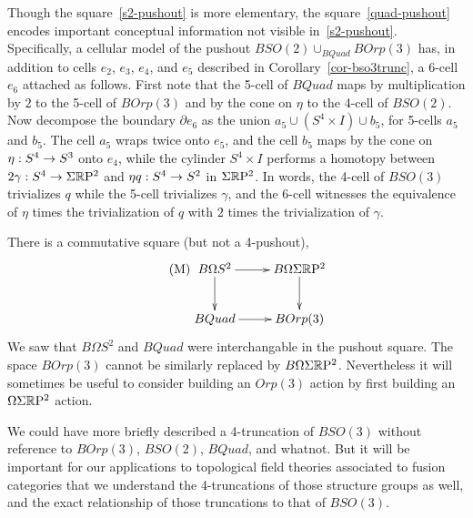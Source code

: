\documentclass{amsart}
\begin{document}
\nid Though the square~\eqref{s2-pushout} is more elementary, the square~\eqref{quad-pushout} encodes important conceptual information not visible in~\eqref{s2-pushout}.  Specifically, a cellular model of the pushout $BSO(2) \cup_{BQuad} BOrp(3)$ has, in addition to cells $e_2$, $e_3$, $e_4$, and $e_5$ described in Corollary~\ref{cor-bso3trunc}, a 6-cell $e_6$ attached as follows.  First note that the 5-cell of $BQuad$ maps by multiplication by $2$ to the 5-cell of $BOrp(3)$ and by the cone on $\eta$ to the 4-cell of $BSO(2)$.  %
Now decompose the boundary $\partial e_6$ as the union $a_5 \cup (S^4 \times I) \cup b_5$, for 5-cells $a_5$ and $b_5$.  The cell $a_5$ wraps twice onto $e_5$, and the cell $b_5$ maps by the cone on $\eta: S^4 \rightarrow S^3$ onto $e_4$, while the cylinder $S^4 \times I$ performs a homotopy between $2 \gamma : S^4 \rightarrow \Sigma \mathbb R \mathrm{P}^2$ and $\eta q: S^4 \rightarrow S^2$ in $\Sigma \mathbb R \mathrm{P}^2$.  In words, the 4-cell of $BSO(3)$ trivializes $q$ while the 5-cell trivializes $\gamma$, and the 6-cell witnesses the equivalence of $\eta$ times the trivialization of $q$ with $2$ times the trivialization of $\gamma$.

\begin{remark}
There is a commutative square (but not a 4-pushout),
\begin{equation}\label{quadmoore} \tag{M}
\xymatrix{
B\Omega S^2 \ar[r] \ar[d] & B\Omega \Sigma \RP^2 \ar[d] \\
BQuad \ar[r] & BOrp(3)
}
\end{equation}
We saw that $B\Omega S^2$ and $BQuad$ were interchangable in the pushout square.  The space $BOrp(3)$ cannot be similarly replaced by $B\Omega \Sigma \mathbb R \mathrm{P}^2$.  Nevertheless it will sometimes be useful to consider building an $Orp(3)$ action by first building an $\Omega \Sigma \mathbb R \mathrm{P}^2$ action.
\end{remark}

\begin{remark}
We could have more briefly described a 4-truncation of $BSO(3)$ without reference to $BOrp(3)$, $BSO(2)$, $BQuad$, and whatnot.  But it will be important for our applications to topological field theories associated to fusion categories that we understand the 4-truncations of those structure groups as well, and the exact relationship of those truncations to that of $BSO(3)$.
\end{remark}
\end{document}
